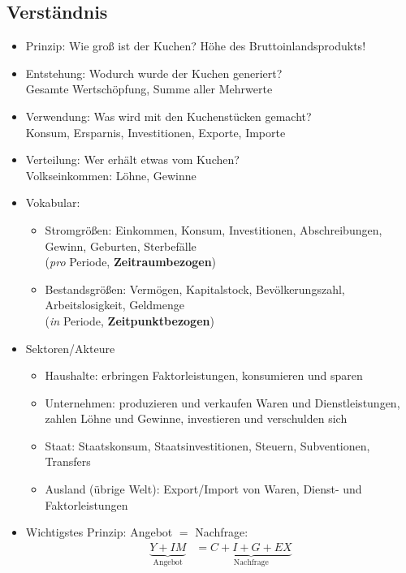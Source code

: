 \documentclass{scrartcl}
\begin{document}
\subsection{Verst\"{a}ndnis}
\begin{itemize}
\item Prinzip: Wie gro{\ss} ist der Kuchen? H\"{o}he des Bruttoinlandsprodukts!
\item Entstehung: Wodurch wurde der Kuchen generiert?\\ Gesamte Wertsch\"{o}pfung, Summe aller Mehrwerte
\item Verwendung: Was wird mit den Kuchenst\"{u}cken gemacht?\\ Konsum, Ersparnis, Investitionen, Exporte, Importe
\item Verteilung: Wer erh\"{a}lt etwas vom Kuchen?\\ Volkseinkommen: L\"{o}hne, Gewinne
\item Vokabular:
    \begin{itemize}
      \item Stromgr\"{o}{\ss}en: Einkommen, Konsum, Investitionen, Abschreibungen, Gewinn, Geburten, Sterbef\"{a}lle\\ (\emph{pro} Periode, \textbf{Zeitraumbezogen})
      \item Bestandsgr\"{o}{\ss}en: Verm\"{o}gen, Kapitalstock, Bev\"{o}lkerungszahl, Arbeitslosigkeit, Geldmenge\\ (\emph{in} Periode, \textbf{Zeitpunktbezogen})
    \end{itemize}
\item Sektoren/Akteure
    \begin{itemize}
      \item Haushalte: erbringen Faktorleistungen, konsumieren und sparen
      \item Unternehmen: produzieren und verkaufen Waren und Dienstleistungen, zahlen L\"{o}hne und Gewinne, investieren und verschulden sich
      \item Staat: Staatskonsum, Staatsinvestitionen, Steuern, Subventionen, Transfers
      \item Ausland (\"{u}brige Welt): Export/Import von Waren, Dienst- und Faktorleistungen
    \end{itemize}
\item Wichtigstes Prinzip: Angebot $=$ Nachfrage:
    \begin{align*}
      \underbrace{Y+IM}_\text{Angebot} &= \underbrace{C+I+G+EX}_\text{Nachfrage}
    \end{align*}

\end{itemize}
\end{document}
